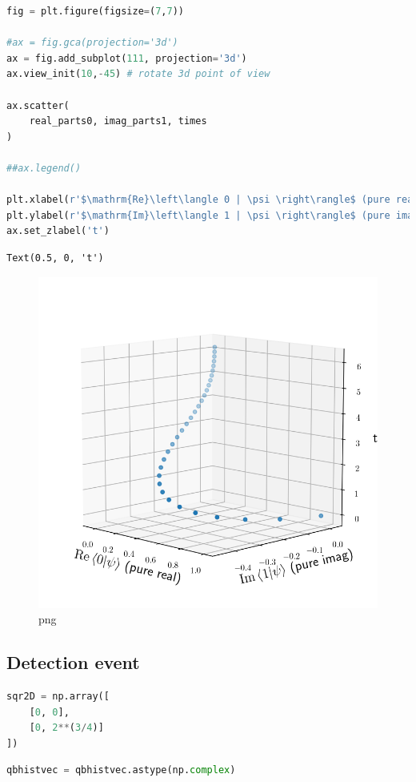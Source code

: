 \begin{lstlisting}[language=Python]
fig = plt.figure(figsize=(7,7))

#ax = fig.gca(projection='3d')
ax = fig.add_subplot(111, projection='3d')
ax.view_init(10,-45) # rotate 3d point of view

ax.scatter(
    real_parts0, imag_parts1, times
)

##ax.legend()

plt.xlabel(r'$\mathrm{Re}\left\langle 0 | \psi \right\rangle$ (pure real)')
plt.ylabel(r'$\mathrm{Im}\left\langle 1 | \psi \right\rangle$ (pure imag)')
ax.set_zlabel('t')
\end{lstlisting}

\begin{lstlisting}
Text(0.5, 0, 't')
\end{lstlisting}

\begin{figure}
\centering
\includegraphics[width=0.6\linewidth]{output_92_1.png}
\caption{png}
\end{figure}

\hypertarget{detection-event}{%
\subsection{Detection event}\label{detection-event}}

\begin{lstlisting}[language=Python]
sqr2D = np.array([
    [0, 0],
    [0, 2**(3/4)]
])
\end{lstlisting}

\begin{lstlisting}[language=Python]
qbhistvec = qbhistvec.astype(np.complex)
\end{lstlisting}

